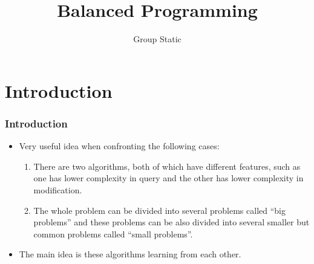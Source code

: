 \documentclass[landscape]{beamer}
\begin{document}
	\title{\textbf{Balanced Programming}}
	\author{Group Static}
	\maketitle
	\section*{Introduction}
	\begin{frame}
		\frametitle{Introduction}
		\begin{itemize}
			\item Very useful idea when confronting the following cases:\pause
			\begin{enumerate}
				\item There are two algorithms, both of which have different features, such as one has
				lower complexity in query and the other has lower complexity in modification.\pause
				\item The whole problem can be divided into several problems called ``big problems'' and these problems can be also
				divided into several smaller but common problems called ``small problems''.\pause
			\end{enumerate}
			\item The main idea is these algorithms learning from each other.
		\end{itemize}
	\end{frame}
\end{document}
